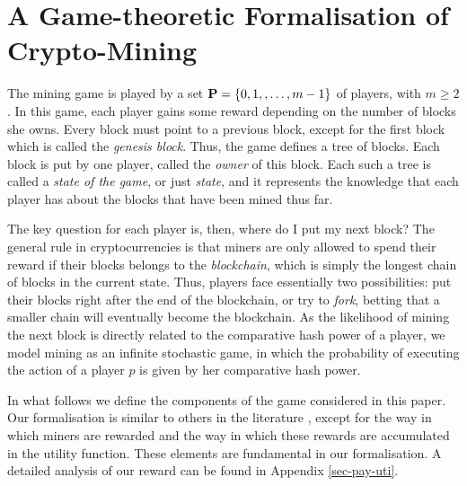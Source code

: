 
\section{A Game-theoretic Formalisation of Crypto-Mining}
\label{sec-formalization}

The mining game is played by a set $\mathbf{P} = \{0, 1, , \ldots, m-1\}$ of players, with $m \geq 2$.
In this game, each player gains some reward depending on the number of blocks she owns. Every block must point to a previous block, except for the first block which is called the {\em genesis block}. Thus, the game defines a tree of blocks. Each block is put by one player, called the {\em owner} of this block. Each such a tree is called a {\em state of the game}, or just {\em state}, and it represents the knowledge that each player has about the blocks that have been mined thus far.

The key question for each player is, then, where do I put my next block? The general rule in cryptocurrencies is that miners are only allowed to spend their reward if their blocks belongs to the \emph{blockchain}, which is simply the longest chain of blocks in the current state. Thus, players face essentially two possibilities: put their blocks right after the end of the blockchain, or try to \emph{fork}, betting that a smaller chain will eventually become the blockchain. As the likelihood of mining the next block is directly related to the comparative hash power of a player, we model mining as an infinite stochastic game, in which the probability of executing the action of a player $p$ is given by her comparative hash power.

In what follows we define the components of the game considered in this paper. Our formalisation is similar to others in the literature \cite{mininggames:2016,koutsoupias2018blockchain}, except for the way in which miners are rewarded and the way in which these rewards are accumulated in the utility function. These elements are fundamental in our formalisation. A detailed analysis of our reward can be found in Appendix \ref{sec-pay-uti}. 

